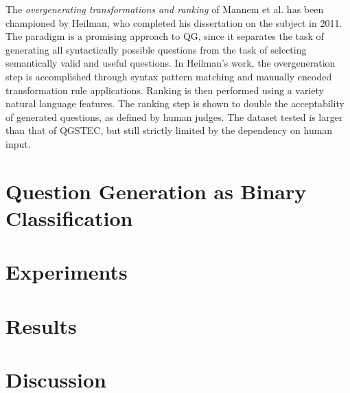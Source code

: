 The \textit{overgenerating transformations and ranking} of Mannem et al. has been championed by Heilman, who completed his dissertation on the subject in 2011. The paradigm is a promising approach to QG, since it separates the task of generating all syntactically possible questions from the task of selecting semantically valid and useful questions. In Heilman's work, the overgeneration step is accomplished through syntax pattern matching and manually encoded transformation rule applications. Ranking is then performed using a variety natural language features. The ranking step is shown to double the acceptability of generated questions, as defined by human judges. The dataset tested is larger than that of QGSTEC, but still strictly limited by the dependency on human input.

\section{Question Generation as Binary Classification}

\section{Experiments}

\section{Results}

\section{Discussion}
